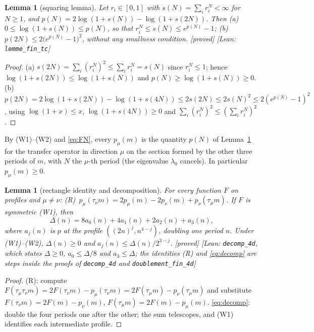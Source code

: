 \documentclass[11pt,a4paper]{article}
\theoremstyle{plain}
\newtheorem{lemma}[theorem]{Lemma}
\theoremstyle{definition}
\theoremstyle{remark}
\numberwithin{equation}{section}
\newcommand{\st}[1]{\textsf{[#1]}}
\begin{document}
\begin{lemma}[squaring lemma]\label{lem:squaring}
Let $r_i\in[0,1]$ with $s(N)=\sum_ir_i^N<\infty$ for $N\ge1$, and $p(N)=2\log(1+s(N))-\log(1+s(2N))$. Then
(a)~$0\le\log(1+s(N))\le p(N)$, so that $r_i^N\le s(N)\le e^{p(N)}-1$; (b)~$p(2N)\le2\bigl(e^{p(N)}-1\bigr)^2$, without any smallness
condition. \st{proved} \st{Lean: \texttt{lemme\_fin\_tc}}
\end{lemma}
\begin{proof}
(a) $s(2N)=\sum_i(r_i^N)^2\le\sum_ir_i^N=s(N)$ since $r_i^N\le1$; hence $\log(1+s(2N))\le\log(1+s(N))$ and $p(N)\ge\log(1+s(N))\ge0$.
(b) $p(2N)=2\log(1+s(2N))-\log(1+s(4N))\le2s(2N)\le2s(N)^2\le2(e^{p(N)}-1)^2$, using $\log(1+x)\le x$, $\log(1+s(4N))\ge0$ and
$\sum_i(r_i^N)^2\le(\sum_ir_i^N)^2$.
\end{proof}

By (W1)--(W2) and \eqref{eq:FN}, every $p_\mu(m)$ is the quantity $p(N)$ of Lemma~\ref{lem:squaring} for the transfer operator in
direction $\mu$ on the section formed by the other three periods of $m$, with $N$ the $\mu$-th period (the eigenvalue $\lambda_0$ cancels).
In particular $p_\mu(m)\ge0$.

\begin{lemma}[rectangle identity and decomposition]\label{lem:rect}
For every function $F$ on profiles and $\mu\ne\nu$:
(R)~$p_\mu(\tau_\nu m)=2p_\mu(m)-2p_\nu(m)+p_\nu(\tau_\mu m)$. If $F$ is symmetric (W1), then
\begin{equation}\label{eq:decomp}
\Delta(n)=8a_0(n)+4a_1(n)+2a_2(n)+a_3(n),
\end{equation}
where $a_j(n)$ is $p$ at the profile $((2n)^j,n^{4-j})$, doubling one period $n$.
Under (W1)--(W2), $\Delta(n)\ge0$ and $a_j(n)\le\Delta(n)/2^{3-j}$. \st{proved} \st{Lean: \texttt{decomp\_4d}, which states $\Delta\ge0$, $a_0\le\Delta/8$ and $a_3\le\Delta$; the identities (R) and \eqref{eq:decomp} are steps inside the proofs of \texttt{decomp\_4d} and \texttt{doublement\_fin\_4d}}
\end{lemma}
\begin{proof}
(R): compute $F(\tau_\mu\tau_\nu m)=2F(\tau_\nu m)-p_\mu(\tau_\nu m)=2F(\tau_\mu m)-p_\nu(\tau_\mu m)$ and substitute
$F(\tau_\nu m)=2F(m)-p_\nu(m)$, $F(\tau_\mu m)=2F(m)-p_\mu(m)$. \eqref{eq:decomp}: double the four periods one after the other; the sum
telescopes, and (W1) identifies each intermediate profile.
\end{proof}
\end{document}
